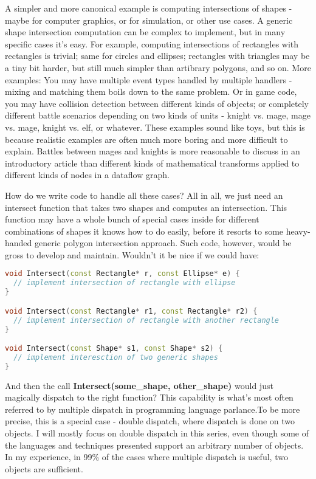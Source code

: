 \documentclass{book}
\begin{document}
A simpler and more canonical example is computing intersections of shapes - maybe for computer graphics, or for simulation, or other use cases.
A generic shape intersection computation can be complex to implement, but in many specific cases it's easy.
For example, computing intersections of rectangles with rectangles is trivial; same for circles and ellipses; rectangles with triangles may be a tiny bit harder,
but still much simpler than artibrary polygons, and so on. 
More examples: You may have multiple event types handled by multiple handlers - mixing and matching them boils down to the same problem. 
Or in game code, you may have collision detection between different kinds of objects; 
or completely different battle scenarios depending on two kinds of units - knight vs. mage, mage vs. mage, knight vs. elf, or whatever. 
These examples sound like toys, but this is because realistic examples are often much more boring and more difficult to explain. 
Battles between mages and knights is more reasonable to discuss in an introductory article than different kinds of mathematical transforms applied to different kinds of nodes in a dataflow graph.

How do we write code to handle all these cases? All in all, we just need an intersect function that takes two shapes and computes an intersection.
This function may have a whole bunch of special cases inside for different combinations of shapes it knows how to do easily, before it resorts to some heavy-handed generic polygon intersection approach.
Such code, however, would be gross to develop and maintain. Wouldn't it be nice if we could have:

\begin{lstlisting}[caption={C++ runtime polymorphism}, language=C++]
void Intersect(const Rectangle* r, const Ellipse* e) {
  // implement intersection of rectangle with ellipse
}

void Intersect(const Rectangle* r1, const Rectangle* r2) {
  // implement intersection of rectangle with another rectangle
}

void Intersect(const Shape* s1, const Shape* s2) {
  // implement interesction of two generic shapes
}
\end{lstlisting}
And then the call \textbf{Intersect(some\_shape, other\_shape)} would just magically dispatch to the right function? 
This capability is what's most often referred to by multiple dispatch in programming language parlance.To be more precise, 
this is a special case - double dispatch, where dispatch is done on two objects. 
I will mostly focus on double dispatch in this series, even though some of the languages and techniques presented support an arbitrary number of objects. 
In my experience, in 99\% of the cases where multiple dispatch is useful, two objects are sufficient.
\end{document}

